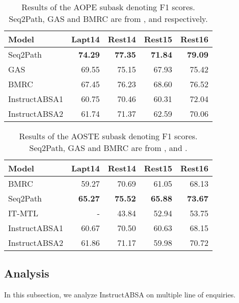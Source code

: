 \documentclass[11pt]{article}
\newcommand{\name}{\textsc{I}nstruct\textsc{ABSA}\xspace}
\begin{document}
 \begin{table}[t!]
\centering
\resizebox{\columnwidth}{!}
{
\begin{tabular}{lrrrr}
\hline
\textbf{Model} & \textbf{Lapt14} & \textbf{Rest14} & \textbf{Rest15} & \textbf{Rest16} \\ \hline
Seq2Path   & \textbf{74.29}     & \textbf{77.35}     &\textbf{71.84}     & \textbf{79.09} \\
GAS              & 69.55     & 75.15     & 67.93     & 75.42 \\ 
BMRC   & 67.45     & 76.23     & 68.60     & 76.52 \\ 
\hline
\name{}1 & 60.75 & 70.46 & 60.31 & 72.04 \\
\name{}2 & 61.74 & 71.37 & 62.59 & 70.06 \\
\hline
\end{tabular}
}
\caption{Results of the AOPE subask denoting F1 scores. 
Seq2Path, GAS and BMRC are from \citet{mao-etal-2022-seq2path}, \citet{zhang-etal-2021-towards-generative} and \citet{chen2021bidirectional} respectively.
}
\label{tab:aope_result}
\end{table}
 \begin{table}[t!]
\centering
\resizebox{\columnwidth}{!}
{
\begin{tabular}{lrrrr}
\hline
\textbf{Model} & \textbf{Lapt14} & \textbf{Rest14} & \textbf{Rest15} & \textbf{Rest16} \\ \hline
BMRC   & 59.27      & 70.69     & 61.05     & 68.13 \\
Seq2Path  & \textbf{65.27} & \textbf{75.52} & \textbf{65.88} & \textbf{73.67} \\
IT-MTL    & -     & 43.84   & 52.94    & 53.75 \\ 
\hline
\name{}1 & 60.67 & 70.50 & 60.63 & 68.15 \\
\name{}2 & 61.86 & 71.17 & 59.98 & 70.72 \\
\hline
\end{tabular}
}
\caption{Results of the AOSTE subask denoting F1 scores. 
Seq2Path, GAS and BMRC are from \citet{chen2021bidirectional}, \citet{mao-etal-2022-seq2path} and \citet{varia2023instruction}.
}
\label{tab:aoste_result}
\end{table} 





\subsection{Analysis}
\label{analysis}
In this subsection, we analyze InstructABSA on multiple line of enquiries.
\end{document}
